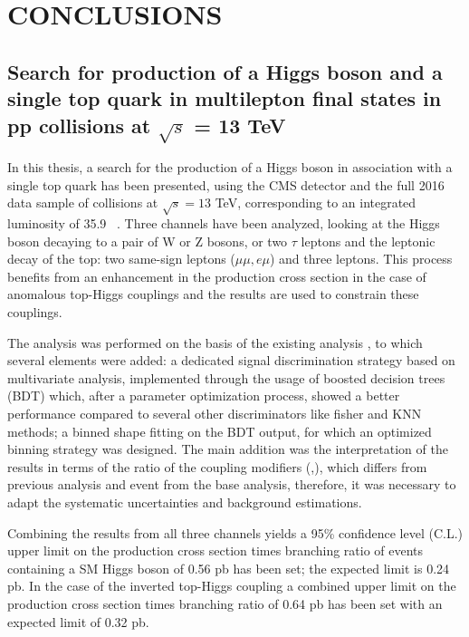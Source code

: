 \chapter{CONCLUSIONS}
\label{ch:Conclusions}

\section[Search for production of a Higgs boson and a single top quark]{Search for production of a Higgs boson and a single top quark in multilepton final states in pp collisions at $\sqrt{s}$ = 13 TeV}

In this thesis, a search for the production of a Higgs boson in association with a single top quark has been presented, using the CMS detector and the full 2016 data sample of \pp collisions at $\sqrt{s}=13$ TeV, corresponding to an integrated luminosity of 35.9 ~\fbinv. Three channels have been analyzed, looking at the Higgs boson decaying to a pair of W or Z bosons, or two $\tau$ leptons and the leptonic decay of the top: two same-sign leptons ($\mu\mu, e\mu$) and three leptons. This process benefits from an enhancement in the production cross section in the case of anomalous top-Higgs couplings and the results are used to constrain these couplings.

The analysis was performed on the basis of the existing analysis  \cite{CMS_AN_2017-029}, to which several elements were added: a dedicated signal discrimination strategy based on multivariate analysis, implemented through the usage of boosted decision trees (BDT) which, after a parameter optimization process, showed a better performance compared to several other discriminators like fisher and KNN methods; a binned shape fitting on the BDT output, for which an optimized binning strategy was designed. The main addition was the interpretation of the results in terms of the ratio of the coupling modifiers (\Ct,\CV), which differs from previous analysis and event from the base \ttH analysis, therefore, it was necessary to adapt the systematic uncertainties and background estimations.

Combining the results from all three channels yields a 95\% confidence level (C.L.) upper limit on the production cross section times branching ratio of events containing a SM Higgs boson of 0.56 pb has been set; the expected limit is 0.24 pb. In the case of the inverted top-Higgs coupling a combined upper limit on the production cross section times branching ratio of 0.64 pb has been set with an expected limit of 0.32 pb.  

